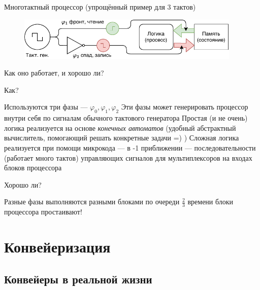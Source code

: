 \documentclass[xetex,aspectratio=43]{beamer}
\begin{document}
\begin{frame}{Многотактный процессор (упрощённый пример для 3 тактов)}
    \begin{figure}
        \includegraphics[width=0.95\textwidth, page=3]{img/11.CPUS.drawio-crop.pdf}
    \end{figure}
\end{frame}

\begin{frame}{Как оно работает, и хорошо ли?}
    \begin{block}{Как?}
        \begin{outline}[itemize]
        \1 Используются три фазы --- $\varphi_0, \varphi_1, \varphi_2$
            \2 Эти фазы может генерировать процессор внутри себя по сигналам обычного тактового генератора
        \1 Простая (и не очень) логика реализуется на основе \emph{конечных автоматов} (удобный абстрактный вычислитель, помогающий решать конкретные задачи =) )
        \1 Сложная логика реализуется при помощи микрокода --- в -1 приближении --- последовательности (работает много тактов) управляющих сигналов для мультиплексоров на входах блоков процессора
    \end{outline}
    \end{block}

    \pause
    \begin{block}{Хорошо ли?}
    \begin{outline}[itemize]
        \1 Разные фазы выполняются разными блоками по очереди
            \2 $\frac{2}{3}$ времени блоки процессора простаивают!
    \end{outline}
    \end{block}
\end{frame}

\section{Конвейеризация}

\subsection{Конвейеры в реальной жизни}
\end{document}
